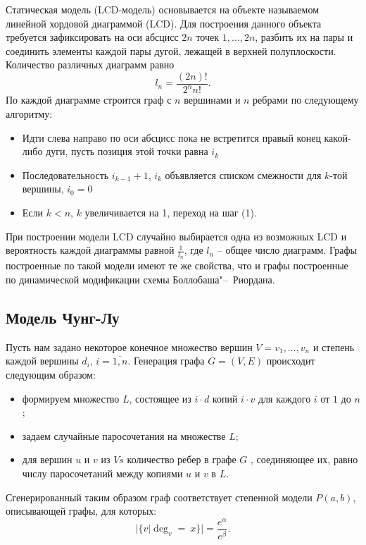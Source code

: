 \documentclass[bachelor, och, diploma]{SCWorks}
\begin{document}
Статическая модель (LCD-модель) основывается на объекте называемом линейной хордовой диаграммой (LCD). Для построения данного объекта требуется зафиксировать на оси абсцисс $ 2n $ точек $ {1,…,2n} $, разбить их на пары и соединить элементы каждой пары дугой, лежащей в верхней полуплоскости. Количество различных диаграмм равно
\[
l_n=\frac{(2n)!}{2^nn!}. 
\]
По каждой диаграмме строится граф с $ n $ вершинами и $ n $ ребрами по следующему алгоритму: 
\begin{itemize}
\item Идти слева направо по оси абсцисс пока не встретится правый конец какой-либо дуги, пусть позиция этой точки равна $ i_k $
\item Последовательность $ i_{k-1}+1$, $i_k $ объявляется списком смежности для $k$-той вершины, $ i_0=0 $
\item Если $ k<n $, $ k $ увеличивается на 1, переход на шаг (1).
\end{itemize}
	
При построении модели LCD случайно выбирается одна из возможных LCD и вероятность каждой диаграммы равной $ \frac{1}{l_n} $, где $ l_n $ – общее число диаграмм. Графы построенные по такой модели имеют те же свойства, что и графы построенные по динамической модификации схемы Боллобаша"--~Риордана.
\subsection{Модель Чунг-Лу}
Пусть нам задано некоторое конечное множество вершин $ V ={v_1 ,… , v_n}  $ и степень каждой вершины $ d_i$, $i=\overline{1,n} $. Генерация графа $ G = (V, E) $ происходит следующим образом:
\begin{itemize}
\item формируем множество $ L $, состоящее из $ i \cdot d $ копий $ i \cdot v $ для каждого $ i $ от $ 1 $ до $ n $;
\item задаем случайные паросочетания на множестве $ L $;
\item для вершин $ u $ и $ v $ из $ Vs $ количество ребер в графе $ G $ , соединяющее их, равно числу паросочетаний между копиями $ u $ и $ v $ в $ L $\cite{article}.
\end{itemize}
Сгенерированный таким образом граф соответствует степенной модели $ P(a,b) $, описывающей графы, для которых:
\[
|\{v|\deg_v=\ x\}|=\frac{e^\alpha}{e^\beta}. 
\]
\end{document}
